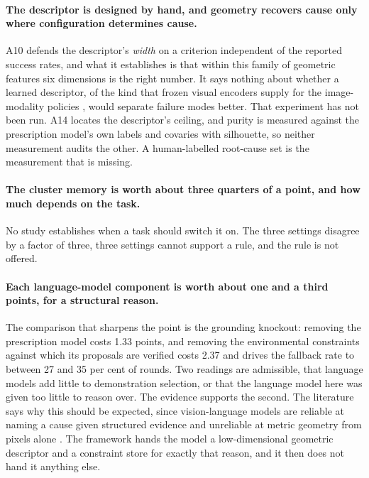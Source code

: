 \documentclass[letterpaper]{article}
\begin{document}
\paragraph{The descriptor is designed by hand, and geometry recovers cause only where
configuration determines cause.} A10 defends the descriptor's \emph{width} on a criterion
independent of the reported success rates, and what it establishes is that within this
family of geometric features six dimensions is the right number. It says nothing about
whether a learned descriptor, of the kind that frozen visual encoders supply for the
image-modality policies \citep{nair2022r3m}, would separate failure modes better. That
experiment has not been run. A14 locates the descriptor's ceiling, and purity is measured
against the prescription model's own labels and covaries with silhouette, so neither
measurement audits the other. A human-labelled root-cause set is the measurement that is
missing.

\paragraph{The cluster memory is worth about three quarters of a point, and how much
depends on the task.} No study establishes when a task should switch it on. The three
settings disagree by a factor of three, three settings cannot support a rule, and the
rule is not offered.

\paragraph{Each language-model component is worth about one and a third points, for a
structural reason.} The comparison that sharpens the point is the grounding knockout:
removing the prescription model costs 1.33 points, and removing the environmental
constraints against which its proposals are verified costs 2.37 and drives the fallback
rate to between 27 and 35 per cent of rounds. Two readings are admissible, that language
models add little to demonstration selection, or that the language model here was given
too little to reason over. The evidence supports the second. The literature says why this
should be expected, since vision-language models are reliable at naming a cause given
structured evidence and unreliable at metric geometry from pixels alone
\citep{chen2024spatialvlm, fu2024blink}. The framework hands the model a low-dimensional
geometric descriptor and a constraint store for exactly that reason, and it then does not
hand it anything else.
\end{document}
